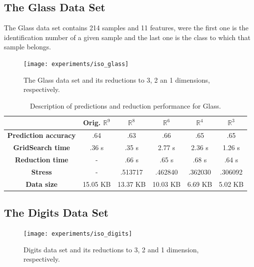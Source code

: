 \newpage
\subsection{The Glass Data Set}

The Glass data set contains 214 samples and 11 features, were the first one is the identification number of a given sample and the last one is the class to which that sample belongs.

\begin{figure}[H]
	\centering
	\texttt{[image: experiments/iso\_glass]}
	\captionsetup{justification=centering}
	\caption{The Glass data set and its reductions to 3, 2 an 1 dimensions, respectively.}
\end{figure}

\begin{table}[H]
	\centering
	\begin{tabular}{|c|c|c|c|c|c|}
		\hline
		& \textbf{Orig. $\mathbb{R}^{9}$} & \textbf{$\mathbb{R}^8$} & \textbf{$\mathbb{R}^6$} & \textbf{$\mathbb{R}^4$}  & \textbf{$\mathbb{R}^3$} \\\hline
		\textbf{Prediction accuracy}   & .64 & .63  & .66 & .65  & .65 \\\hline
		\textbf{GridSearch time} & .36 s & .35 s   & 2.77 s & 2.36 s & 1.26 s  \\\hline
		\textbf{Reduction time}  & -  & .66 s & .65 s & .68 s    & .64 s     \\\hline
		\textbf{Stress} & - & .513717 & .462840 & .362030 & .306092 \\\hline
		\textbf{Data size}          & 15.05 KB & 13.37 KB & 10.03 KB & 6.69 KB & 5.02 KB   \\\hline
	\end{tabular}
	
	\caption{Description of predictions and reduction performance for Glass.}
\end{table}

\newpage
\subsection{The Digits Data Set}

\begin{figure}[H]
	\centering
	\texttt{[image: experiments/iso\_digits]}
	\captionsetup{justification=centering}
	\caption{Digits data set and its reductions to 3, 2 and 1 dimension, respectively.}
	\label{fig:dsdigitsiso}
\end{figure}

